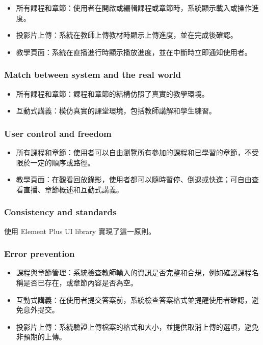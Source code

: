 \documentclass[12pt]{article}
\begin{document}
\begin{itemize}
  \item 所有課程和章節：使用者在開啟或編輯課程或章節時，系統顯示載入或操作進度。
  \item 投影片上傳：系統在教師上傳教材時顯示上傳進度，並在完成後確認。
  \item 教學頁面：系統在直播進行時顯示播放進度，並在中斷時立即通知使用者。
\end{itemize}

\subsubsection{Match between system and the real world}

\begin{itemize}
  \item 所有課程和章節：課程和章節的結構仿照了真實的教學環境。
  \item 互動式講義：模仿真實的課堂環境，包括教師講解和學生練習。
\end{itemize}

\subsubsection{User control and freedom}

\begin{itemize}
  \item 所有課程和章節：使用者可以自由瀏覽所有參加的課程和已學習的章節，不受限於一定的順序或路徑。
  \item 教學頁面：在觀看回放錄影，使用者都可以隨時暫停、倒退或快進；可自由查看直播、章節概述和互動式講義。
\end{itemize}

\subsubsection{Consistency and standards}

使用 Element Plus UI library 實現了這一原則。

\subsubsection{Error prevention}

\begin{itemize}
  \item 課程與章節管理：系統檢查教師輸入的資訊是否完整和合規，例如確認課程名稱是否已存在，或章節內容是否為空。
  \item 互動式講義：在使用者提交答案前，系統檢查答案格式並提醒使用者確認，避免意外提交。
  \item 投影片上傳：系統驗證上傳檔案的格式和大小，並提供取消上傳的選項，避免非預期的上傳。
\end{itemize}
\end{document}
